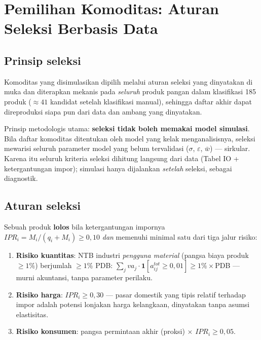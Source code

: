 \documentclass[
  manuscript=article,
  layout=publish,
  year=2026,
  volume=1,
]{den}
\providecommand{\tightlist}{%
  \setlength{\itemsep}{0pt}\setlength{\parskip}{0pt}}
\begin{document}
\section{Pemilihan Komoditas: Aturan Seleksi Berbasis
Data}\label{sec-screening}

\subsection{Prinsip seleksi}\label{prinsip-seleksi}

Komoditas yang disimulasikan dipilih melalui aturan seleksi yang
dinyatakan di muka dan diterapkan mekanis pada \emph{seluruh} produk
pangan dalam klasifikasi 185 produk (\(\approx 41\) kandidat setelah
klasifikasi manual), sehingga daftar akhir dapat direproduksi siapa pun
dari data dan ambang yang dinyatakan.

Prinsip metodologis utama: \textbf{seleksi tidak boleh memakai model
simulasi}. Bila daftar komoditas ditentukan oleh model yang kelak
menganalisisnya, seleksi mewarisi seluruh parameter model yang belum
tervalidasi (\(\sigma\), \(\varepsilon\), \(\bar w\)) --- sirkular.
Karena itu seluruh kriteria seleksi dihitung langsung dari data (Tabel
IO + ketergantungan impor); simulasi hanya dijalankan \emph{setelah}
seleksi, sebagai diagnostik.

\subsection{Aturan seleksi}\label{aturan-seleksi}

Sebuah produk \textbf{lolos} bila ketergantungan impornya
\(IPR_i = M_i/(q_i + M_i) \geq 0{,}10\) \emph{dan} memenuhi minimal satu
dari tiga jalur risiko:

\begin{enumerate}
\def\labelenumi{\arabic{enumi}.}
\tightlist
\item
  \textbf{Risiko kuantitas}: NTB industri \emph{pengguna material}
  (pangsa biaya produk \(\geq 1\%\)) berjumlah \(\geq 1\%\) PDB:
  \(\sum_j va_j \cdot \mathbf{1}[a^{tot}_{ij} \geq 0{,}01] \geq 1\%\times\)PDB
  --- murni akuntansi, tanpa parameter perilaku.
\item
  \textbf{Risiko harga}: \(IPR_i \geq 0{,}30\) --- pasar domestik yang
  tipis relatif terhadap impor adalah potensi lonjakan harga kelangkaan,
  dinyatakan tanpa asumsi elastisitas.
\item
  \textbf{Risiko konsumen}: pangsa permintaan akhir (proksi) \(\times\)
  \(IPR_i \geq
  0{,}05\).
\end{enumerate}
\end{document}
